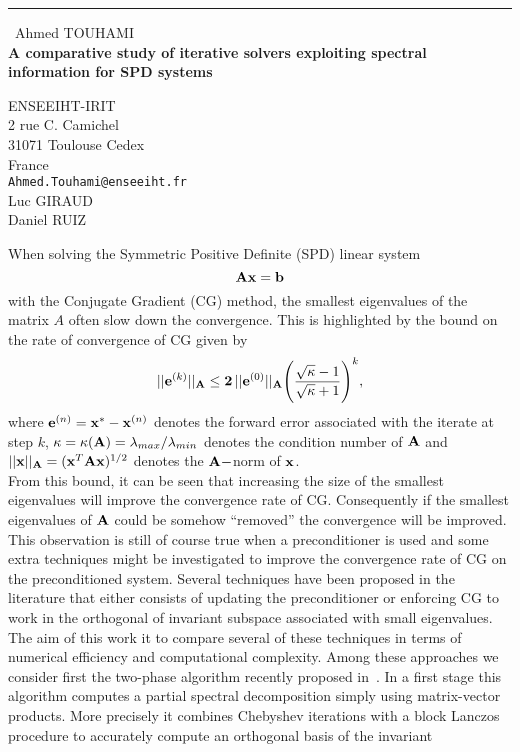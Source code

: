 \documentclass{report}
\begin{document}
\begin{center}
\rule{6in}{1pt} \
{\large Ahmed TOUHAMI \\
{\bf A comparative study of iterative solvers exploiting spectral information for SPD systems}}

ENSEEIHT-IRIT \\ 2 rue C. Camichel \\ 31071 Toulouse Cedex \\ France
\\
{\tt Ahmed.Touhami@enseeiht.fr}\\
Luc GIRAUD\\
Daniel RUIZ\end{center}

When solving the Symmetric Positive Definite (SPD) linear system
$${\bf A x}= {\bf b} $$
with the Conjugate Gradient (CG) method, the smallest eigenvalues of the
matrix $A$ often slow down the convergence.
This is highlighted by the bound on the rate of convergence of CG given by
$$ ||{\bf e}^{(k)}||_{\bf A} \le {\bf 2}\,||{\bf e}^{(0)}||_{\bf A}
\displaystyle\Bigg(\frac{\sqrt \kappa -1}{\sqrt \kappa + 1}\Bigg)^k,$$
where ${\bf e}^{(n)}= {\bf x}^* - {\bf x}^{(n)}$ denotes the forward
error associated with the iterate at step $k$, $\displaystyle \kappa =
\kappa({\bf A}) = \lambda_{max} / \lambda_{min}$ denotes the condition
number of ${\bf A}$ and $||{\bf x}||_{{\bf A}} = ({\bf x}^T{\bf A}{\bf
x})^{1/2}$ denotes the ${\bf A-}$norm of ${\bf x}$. \\
From this bound, it can be seen that increasing the size of the smallest
eigenvalues will improve the convergence rate of CG.
Consequently if the smallest eigenvalues of ${\bf A}$ could be somehow
``removed'' the convergence will be improved.
This observation is still of course true when a preconditioner is used and some
extra techniques might be investigated to improve the convergence rate of
CG on the preconditioned system.
Several techniques have been proposed in the literature that either consists of
updating the preconditioner or enforcing CG to work in the orthogonal of
invariant subspace associated with small eigenvalues.
The aim of this work it to compare several of these techniques in terms
of numerical efficiency and computational complexity.
Among these approaches we consider first the two-phase algorithm recently
proposed in~\cite{arru:02}.
In a first stage this algorithm computes a partial spectral decomposition
simply using matrix-vector products.
More precisely it combines Chebyshev iterations with a block Lanczos
procedure to accurately compute an orthogonal basis of the invariant
\end{document}
